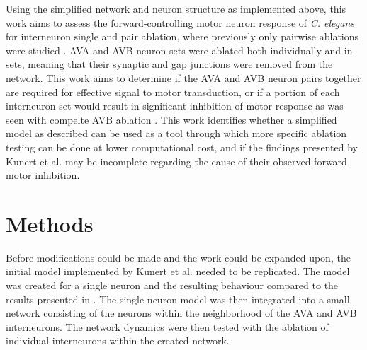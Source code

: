 \documentclass[11pt]{article} %
\begin{document}
Using the simplified network and neuron structure as implemented above, this work aims to assess the forward-controlling motor neuron response of \emph{C. elegans} for interneuron single and pair ablation, where previously only pairwise ablations were studied \cite{Kunert2014}. AVA and AVB neuron sets were ablated both individually and in sets, meaning that their synaptic and gap junctions were removed from the network. This work aims to determine if the AVA and AVB neuron pairs together are required for effective signal to motor transduction, or if a portion of each interneuron set would result in significant inhibition of motor response as was seen with compelte AVB ablation \cite{Kunert2014, Chalfie1985}. This work identifies whether a simplified model as described can be used as a tool through which more specific ablation testing can be done at lower computational cost, and if the findings presented by Kunert et al. may be incomplete regarding the cause of their observed forward motor inhibition.

\section{Methods}

Before modifications could be made and the work could be expanded upon, the initial model implemented by Kunert et al. needed to be replicated. The model was created for a single neuron and the resulting behaviour compared to the results presented in \cite{Kunert2014}. The single neuron model was then integrated into a small network consisting of the neurons within the neighborhood of the AVA and AVB interneurons. The network dynamics were then tested with the ablation of individual interneurons within the created network.
\end{document}
